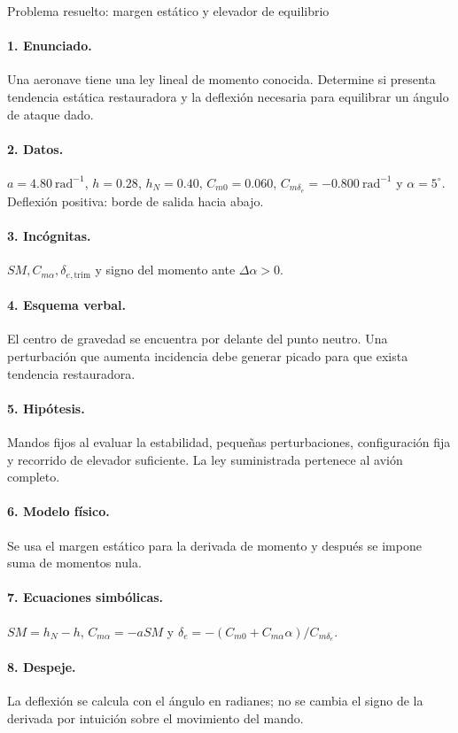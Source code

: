 \begin{studiumworked}{Problema resuelto: margen estático y elevador de equilibrio}

\paragraph{1. Enunciado.} Una aeronave tiene una ley lineal de momento conocida. Determine si presenta tendencia estática restauradora y la deflexión necesaria para equilibrar un ángulo de ataque dado.
\paragraph{2. Datos.} $a=4.80\ \mathrm{rad^{-1}}$, $h=0.28$, $h_N=0.40$, $C_{m0}=0.060$, $C_{m\delta_e}=-0.800\ \mathrm{rad^{-1}}$ y $\alpha=5^\circ$. Deflexión positiva: borde de salida hacia abajo.
\paragraph{3. Incógnitas.} $SM,C_{m\alpha},\delta_{e,\mathrm{trim}}$ y signo del momento ante $\Delta\alpha>0$.
\paragraph{4. Esquema verbal.} El centro de gravedad se encuentra por delante del punto neutro. Una perturbación que aumenta incidencia debe generar picado para que exista tendencia restauradora.
\paragraph{5. Hipótesis.} Mandos fijos al evaluar la estabilidad, pequeñas perturbaciones, configuración fija y recorrido de elevador suficiente. La ley suministrada pertenece al avión completo.
\paragraph{6. Modelo físico.} Se usa el margen estático para la derivada de momento y después se impone suma de momentos nula.
\paragraph{7. Ecuaciones simbólicas.} $SM=h_N-h$, $C_{m\alpha}=-aSM$ y $\delta_e=-(C_{m0}+C_{m\alpha}\alpha)/C_{m\delta_e}$.
\paragraph{8. Despeje.} La deflexión se calcula con el ángulo en radianes; no se cambia el signo de la derivada por intuición sobre el movimiento del mando.

\end{studiumworked}
